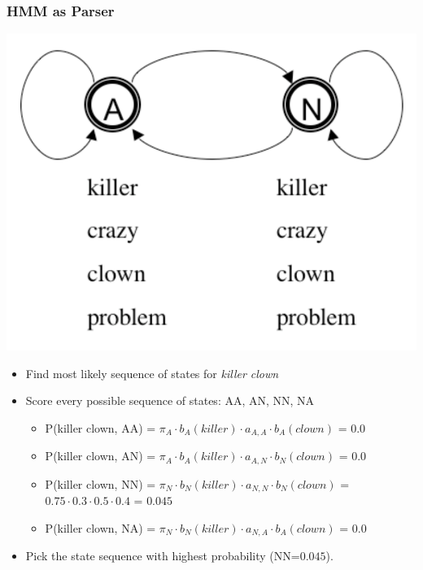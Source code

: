\begin{frame}
\frametitle{HMM as Parser}
\begin{center}
\includegraphics[scale=.3]{figures/hmmfig}
\end{center}
\begin{itemize}[<+->]
\item Find most likely sequence of states for {\it killer clown}
\item Score every possible sequence of states: AA, AN, NN, NA
\begin{itemize}[<+->]
\item {\color{blue} P(killer clown, AA) = $\pi_A \cdot b_A(\textit{killer}) \cdot a_{A,A} \cdot b_A(\textit{clown})$ = $0.0$}
\item {\color{blue} P(killer clown, AN) = $\pi_A \cdot b_A(\textit{killer}) \cdot a_{A,N} \cdot b_N(\textit{clown})$ = $0.0$}
\item {\color{blue} P(killer clown, NN) = $\pi_N \cdot b_N(\textit{killer}) \cdot a_{N,N} \cdot b_N(\textit{clown})$ = $0.75 \cdot 0.3 \cdot 0.5 \cdot 0.4$ = $0.045$}
\item {\color{blue} P(killer clown, NA) = $\pi_N \cdot b_N(\textit{killer}) \cdot a_{N,A} \cdot b_A(\textit{clown})$ = $0.0$}
\end{itemize}
\item Pick the state sequence with highest probability (NN=$0.045$).
\end{itemize}
\end{frame}

